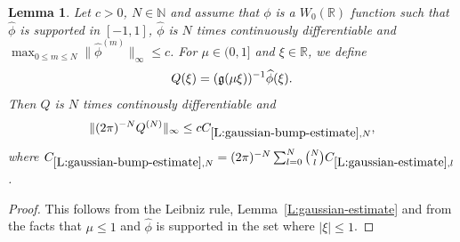 \documentclass[12pt,reqno]{amsart}
\theoremstyle{plain}
\newtheorem{lemma}[theorem]{Lemma}
\numberwithin{equation}{section}
\theoremstyle{remark}
\newcommand{\using}[1]{}
\newcommand{\R}{{\mathbb R}}
\begin{document}
\begin{lemma}\label{L:gaussian-bump-estimate}\using{L:gaussian-estimate}
Let $c>0$, $N \in \mathbb N$ and assume that $\phi$ is a $W_0(\R)$ function such that $\widehat{\phi}$ is supported in $[-1,1]$, $\widehat{\phi}$ is $N$ times continuously differentiable and $\max_{0\leq m \leq N} \|\widehat{\phi}^{(m)}\|_{\infty} \leq c$.
For $\mu \in (0,1]$ and $\xi \in \R$, we define
\begin{equation}\label{auto:Gaussian-bump-quotient}
Q(\xi)=(\mathfrak{g}(\mu\xi))^{-1}\widehat{\phi}(\xi).
\end{equation}
Then $Q$ is $N$ times continously differentiable and
\begin{equation}\label{E:estimate-Q}
\|(2\pi)^{-N}Q^{(N)}\|_{\infty} \leq c C_{\ref{L:gaussian-bump-estimate},N},
\end{equation}
where $C_{\ref{L:gaussian-bump-estimate},N}= (2\pi)^{-N}\sum_{l=0}^N \binom{N}{l} C_{\ref{L:gaussian-estimate},l}$.
\end{lemma}

\begin{proof}

This follows from the Leibniz rule, Lemma~\ref{L:gaussian-estimate} and from the facts that $\mu \leq 1$ and $\widehat{\phi}$ is supported in the set where $|\xi|\leq 1$.
\end{proof}
\end{document}
